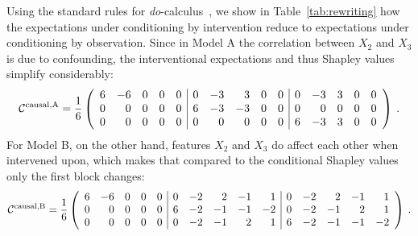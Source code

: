 \documentclass{article}
\newcommand{\contmat}{{\cal C}}
\newcommand{\boven}[2]{#1^{\mbox{\scriptsize #2}}}
\begin{document}
Using the standard rules for \textit{do}-calculus~\cite{pearl1995causal}, we show in Table~\ref{tab:rewriting} how the expectations under conditioning by intervention reduce to expectations under conditioning by observation. Since in Model A the correlation between $X_2$ and $X_3$ is due to confounding, the interventional expectations and thus Shapley values simplify considerably:
\[
\boven{\contmat}{causal,A} = {1 \over 6} \left(\begin{array}{rrrrr|rrrrr|rrrrr}
6 & -6 & 0 & 0 & 0  &
0 & -3 & 3 & 0 & 0  &
0 & -3 & 3 & 0 & 0 \\ 
0 & 0 & 0 & 0 & 0  &
6 & -3 & -3 & 0 & 0  &
0 & 0 & 0 & 0 & 0 \\ 
0 & 0 & 0 & 0 & 0  &
0 & 0 & 0 & 0 & 0  &
6 & -3 & 3 & 0 & 0
\end{array}\right) \: .
\]
For Model B, on the other hand, features $X_2$ and $X_3$ do affect each other when intervened upon, which makes that compared to the conditional Shapley values only the first block changes:
\[
\boven{\contmat}{causal,B} = {1 \over 6} \left(\begin{array}{rrrrr|rrrrr|rrrrr}
6 & -6 & 0 & 0 & 0 &
0 & -2 & 2 & -1 & 1  &
0 & -2 & 2 & -1 & 1 \\ 
0 & 0 & 0 & 0 & 0  &
6 & -2 & -1 & -1 & -2  &
0 & -2 & -1 & 2 & 1 \\ 
0 & 0 & 0 & 0 & 0  &
0 & -2 & -1 & 2 & 1  &
6 & -2 & -1 & -1 & -2
\end{array}\right) \: .
\]
\end{document}
